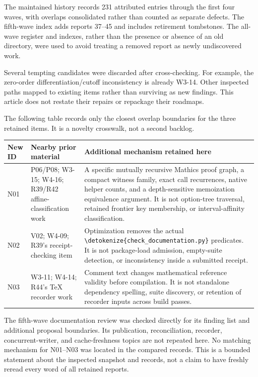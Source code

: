 \documentclass[11pt,letterpaper]{article}
\newcommand{\code}[1]{\expandafter\nolinkurl\expandafter{\detokenize{#1}}}
\begin{document}
The maintained history records 231 attributed entries through the first four waves, with overlaps consolidated rather than counted as separate defects. The fifth-wave index adds reports 37--45 and includes retirement tombstones. The all-wave register and indexes, rather than the presence or absence of an old directory, were used to avoid treating a removed report as newly undiscovered work.\cite{status,wave3,wave4,wave5}

Several tempting candidates were discarded after cross-checking. For example, the zero-order differentiation/cutoff inconsistency is already W3-14. Other inspected paths mapped to existing items rather than surviving as new findings. This article does not restate their repairs or repackage their roadmaps.

The following table records only the closest overlap boundaries for the three retained items. It is a novelty crosswalk, not a second backlog.

\begin{center}\small
\begin{tabularx}{\textwidth}{@{}p{.42in}p{1.48in}Y@{}}
\toprule
New ID & Nearby prior material & Additional mechanism retained here\\
\midrule
N01 & P06/P08; W3-15; W4-16; R39/R42 affine-classification work & A specific mutually recursive Mathics proof graph, a compact witness family, exact call recurrences, native helper counts, and a depth-sensitive memoization equivalence argument. It is not option-tree traversal, retained frontier key membership, or interval-affinity classification.\\
N02 & V02; W4-09; R39's receipt-checking item & Optimization removes the actual \code{check_documentation.py} predicates. It is not package-load admission, empty-suite detection, or inconsistency inside a submitted receipt.\\
N03 & W3-11; W4-14; R44's TeX recorder work & Comment text changes mathematical reference validity before compilation. It is not standalone dependency spelling, suite discovery, or retention of recorder inputs across build passes.\\
\bottomrule
\end{tabularx}
\end{center}

The fifth-wave documentation review was checked directly for its finding list and additional proposal boundaries. Its publication, reconciliation, recorder, concurrent-writer, and cache-freshness topics are not repeated here.\cite{review44} No matching mechanism for N01--N03 was located in the compared records. This is a bounded statement about the inspected snapshot and records, not a claim to have freshly reread every word of all retained reports.
\end{document}
